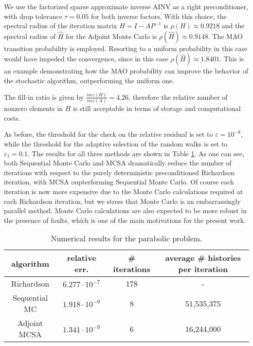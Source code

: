 \documentclass[final,leqno,onefignum,onetabnum]{siamltex1213}
\begin{document}
We use the factorized
sparse approximate inverse AINV \cite{BT1998} as a right preconditioner,
with drop tolerance $\tau = 0.05$ for both inverse factors.
With this choice,
the spectral radius of the iteration matrix $H=I-AP^{-1}$ is $\rho(H)\approx
0.9218$ and the spectral radius of $\hat{H}$ for the Adjoint Monte Carlo is
$\rho(\hat{H})\approx 0.9148$. The MAO transition probability is employed.
 Resorting to a uniform probability in this case would have impeded
the
convergence, since in this case $\rho(\hat{H})\approx 1.8401$.
This is an example demonstrating how the MAO probability can
improve the behavior of the stochastic algorithm, outperforming the
uniform one.

The fill-in ratio is given by $\frac{nnz(H)}{nnz(A)}=4.26$,
therefore the relative number of nonzero elements in $H$ is still acceptable
in terms of storage and computational costs.

As before,
the threshold for the check on the relative residual is set to $\varepsilon
=10^{-8}$, while the threshold
for the adaptive selection of the random walks is set
to $\varepsilon_1=0.1$.
The results for all three methods are shown in Table \ref{parabolic_results}. As
one can see, both Sequential Monte Carlo and MCSA
dramatically reduce the number of iterations with
respect to the purely deterministic
 preconditioned Richardson iteration, with MCSA oupterforming
Sequential Monte Carlo.
Of course each iteration is now more expensive due to the Monte Carlo
calculations required at each Richardson iteration, but we stress
that Monte Carlo is an embarrassingly parallel method.
Monte Carlo calculations are also expected to be more robust in the
presence of faults, which is one of the main motivations for the
present work.

\begin{table}[!t]
\centering
\hspace*{-0.8cm}
\begin{tabular}{|c|c|c|c|}
\hline
algorithm & relative err.& \# iterations & average \# histories per iteration\\
\hline
 Richardson & $6.277\cdot 10^{-7}$ & 178 & - \\
 \hline
 Sequential MC & $1.918 \cdot 10^{-9}$ & 8 & 51,535,375\\
\hline
 Adjoint MCSA & $1.341\cdot 10^{-9}$ & 6 & 16,244,000\\
\hline
\end{tabular}
\caption{Numerical results for the parabolic problem.}
\label{parabolic_results}
\end{table}
\end{document}
